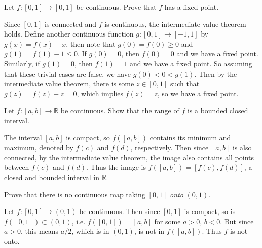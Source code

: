 \documentclass[10pt]{amsart}
\newenvironment{exercise}[1]{%
	\vspace{10mm}
	\renewcommand\themanualtheoreminner{#1}%
  \manualtheoreminner
}\hrulefill{\endmanualtheoreminner}
\begin{document}
\begin{exercise}{Page 193, 4.5.3}
	Let $f:[0,1]\to[0,1]$ be continuous. Prove that $f$ has a fixed point.
\end{exercise}

Since $[0,1]$ is connected and $f$ is continuous, the intermediate value theorem holds. Define another continuous function $g:[0,1] \to [-1,1]$ by $g(x) = f(x) - x$, then note that $g(0) = f(0) \geq 0$ and $g(1) = f(1) - 1 \leq 0$. If $g(0)=0$, then $f(0)=0$ and we have a fixed point. Similarly, if $g(1)=0$, then $f(1)=1$ and we have a fixed point. So assuming that these trivial cases are false, we have $g(0) < 0 < g(1)$. Then by the intermediate value theorem, there is some $z \in [0,1]$ such that $g(z) = f(z) - z = 0$, which implies $f(z) = z$, so we have a fixed point.

\begin{exercise}{Page 194, 4.5.4}
	Let $f:[a,b]\to\mathbb{R}$ be continuous. Show that the range of $f$ is a bounded closed interval.
\end{exercise}

The interval $[a,b]$ is compact, so $f([a,b])$ contains its minimum and maximum, denoted by $f(c)$ and $f(d)$, respectively. Then since $[a,b]$ is also connected, by the intermediate value theorem, the image also contains all points between $f(c)$ and $f(d)$. Thus the image is $f([a,b]) = [f(c), f(d)]$, a closed and bounded interval in $\mathbb{R}$.

\begin{exercise}{Page 194, 4.5.5}
	Prove that there is no continuous map taking $[0,1]$ \textit{onto} $(0,1)$.
\end{exercise}

Let $f: [0,1] \to (0,1)$ be continuous. Then since $[0,1]$ is compact, so is $f([0,1]) \subset (0,1)$, i.e. $f([0,1]) = [a,b]$ for some $a>0$, $b<0$. But since $a > 0$, this means $a/2$, which is in $(0,1)$, is not in $f([a,b])$. Thus $f$ is not onto.
\end{document}
